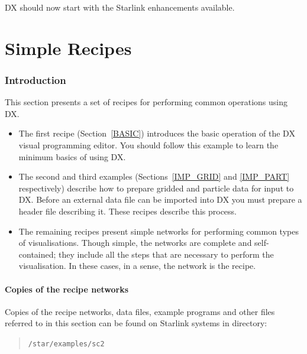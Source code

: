 \documentclass[twoside,11pt]{article}
\newcommand{\stardocinitials}  {SC}
\newcommand{\stardocnumber}    {2.3}
\newcommand{\stardocname}{\stardocinitials /\stardocnumber}
\newcommand{\xlabel}[1]{}
\begin{document}
DX should now start with the Starlink enhancements available.


\cleardoublepage
\markboth{\stardocname}{\stardocname}
\part{Simple Recipes}
\markboth{\stardocname}{\stardocname}
\section{\xlabel{INTRO_RECIP}Introduction}

This section presents a set of recipes for performing common operations
using DX.

\begin{itemize}

  \item The first recipe (Section~\ref{BASIC}) introduces the basic
   operation of the DX visual programming editor. You should follow this
   example to learn the minimum basics of using DX.

  \item The second and third examples (Sections~\ref{IMP_GRID} and
   \ref{IMP_PART} respectively) describe how to prepare gridded and
   particle data for input to DX. Before an external data file can be
   imported into DX you must prepare a header file describing it. These
   recipes describe this process.

  \item The remaining recipes present simple networks for performing
   common types of visualisations. Though simple, the networks are
   complete and self-contained; they include all the steps that are
   necessary to perform the visualisation. In these cases, in a sense,
   the network is the recipe.

\end{itemize}

\subsection{Copies of the recipe networks}

Copies of the recipe networks, data files, example programs and other
files referred to in this section can be found on Starlink systems
in directory:

\begin{quote}
{\tt /star/examples/sc2}
\end{quote}
\end{document}
